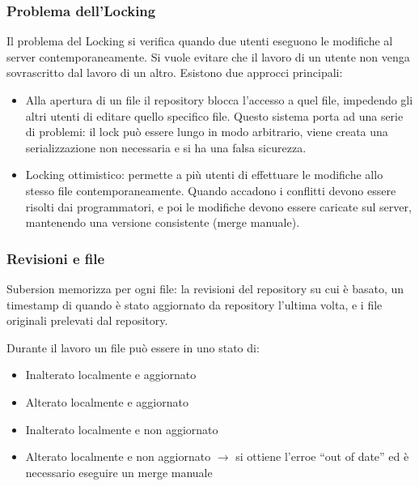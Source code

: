 \subsubsection{Problema dell'Locking}Il problema del Locking si verifica quando due utenti eseguono le modifiche al server contemporaneamente. Si vuole evitare che il lavoro di un utente non venga sovrascritto dal lavoro di un altro. Esistono due approcci principali:
\begin{itemize}

\item Alla apertura di un file il repository blocca l'accesso a quel file, impedendo gli altri utenti di editare quello specifico file. Questo sistema porta ad una serie di problemi: il lock pu\`o essere lungo in modo arbitrario, viene creata una serializzazione non necessaria e si ha una falsa sicurezza.
\item Locking ottimistico: permette a pi\`u utenti di effettuare le modifiche allo stesso file contemporaneamente. Quando accadono i conflitti devono essere risolti dai programmatori, e poi le modifiche devono essere caricate sul server, mantenendo una versione consistente (merge manuale).
  
\end{itemize}

\subsubsection{Revisioni e file}
Subersion memorizza per ogni file: la revisioni del repository su cui \`e basato, un timestamp di quando \`e stato aggiornato da repository l'ultima volta, e i file originali prelevati dal repository.

Durante il lavoro un file pu\`o essere in uno stato di:
\begin{itemize}

\item Inalterato localmente e aggiornato
\item Alterato localmente e aggiornato
\item Inalterato localmente e non aggiornato
\item Alterato localmente e non aggiornato $\to$ si ottiene l'erroe ``out of date'' ed \`e necessario eseguire un merge manuale
  
\end{itemize}

